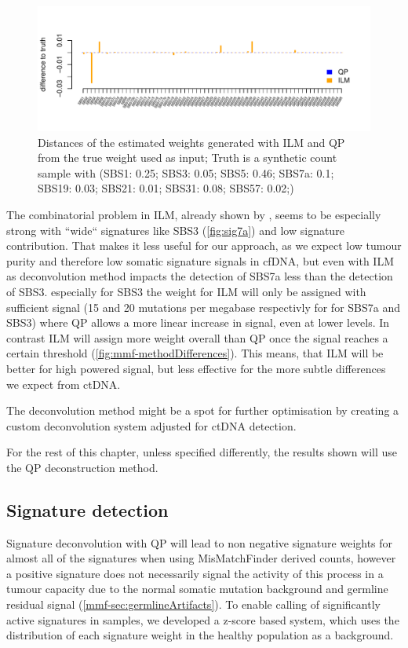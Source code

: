 \begin{figure}[!ht]
\centering
\includegraphics[width=.99\linewidth]{Figures/lowInputSignalDeconv.pdf}
\caption[Distance of deconvolution methods from truth]{Distances of the estimated weights generated with ILM and QP from the true weight used as input; Truth is a synthetic count sample with (SBS1: 0.25; SBS3: 0.05; SBS5: 0.46; SBS7a: 0.1; SBS19: 0.03; SBS21: 0.01; SBS31: 0.08; SBS57: 0.02;)}\label{fig:mmf-ILMerror}
\end{figure}
 
The combinatorial problem in ILM, already shown by \textcite{Lynch2016}, seems to be especially strong with ``wide`` signatures like SBS3 (\autoref{fig:sig7a}) and low signature contribution. That makes it less useful for our approach, as we expect low tumour purity and therefore low somatic signature signals in cfDNA, but even with ILM as deconvolution method impacts the detection of SBS7a less than the detection of SBS3. especially for SBS3 the weight for ILM will only be assigned with sufficient signal (15 and 20 mutations per megabase respectivly for for SBS7a and SBS3) where QP allows a more linear increase in signal, even at lower levels. In contrast ILM will assign more weight overall than QP once the signal reaches a certain threshold (\autoref{fig:mmf-methodDifferences}). This means, that ILM will be better for high powered signal, but less effective for the more subtle differences we expect from ctDNA.

The deconvolution method might be a spot for further optimisation by creating a custom deconvolution system adjusted for ctDNA detection.

For the rest of this chapter, unless specified differently, the results shown will use the QP deconstruction method.



\subsection{Signature detection}
\label{mmf-sec:sigdetection}
Signature deconvolution with QP will lead to non negative signature weights for almost all of the signatures when using MisMatchFinder derived counts, however a positive signature does not necessarily signal the activity of this process in a tumour capacity due to the normal somatic mutation background and germline residual signal (\autoref{mmf-sec:germlineArtifacts}). To enable calling of significantly active signatures in samples, we developed a z-score based system, which uses the distribution of each signature weight in the healthy population as a background.

